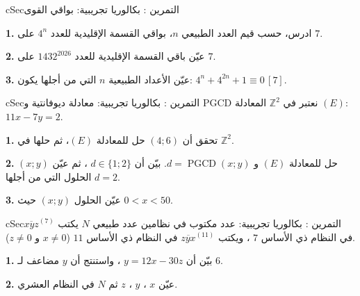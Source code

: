 \documentclass[12pt,a4paper]{article}
\newenvironment{BOX}[2]{\begin{otherlanguage}{english}\begin{arbox}{#1}{#2}}{\end{arbox}\end{otherlanguage}}
\newcounter{exo}
\newenvironment{tamrin}[1]{\stepcounter{exo}\begin{BOX}{cSec}{التمرين \theexo: #1}}{\end{BOX}}
\newcommand{\Z}{\mathbb{Z}}
\newcommand{\pgcd}{\operatorname{PGCD}}
\newcommand{\QQ}[1]{\par\smallskip\textbf{#1.} }
\begin{document}
\begin{tamrin}{بكالوريا تجريبية: بواقي القوى}
\QQ{1} ادرس، حسب قيم العدد الطبيعي $n$، بواقي القسمة الإقليدية للعدد $4^n$ على $7$.
\QQ{2} عيّن باقي القسمة الإقليدية للعدد $1432^{2026}$ على $7$.
\QQ{3} عيّن الأعداد الطبيعية $n$ التي من أجلها يكون: $4^n+4^{2n}+1\equiv0\,[7]$.
\end{tamrin}

\begin{tamrin}{بكالوريا تجريبية: معادلة ديوفانتية و PGCD}
نعتبر في $\Z^2$ المعادلة $(E)$: $11x-7y=2$.
\QQ{1} تحقق أن $(4;6)$ حل للمعادلة $(E)$، ثم حلها في $\Z^2$.
\QQ{2} $(x;y)$ حل للمعادلة $(E)$ و $d=\pgcd(x;y)$. بيّن أن $d\in\{1;2\}$ ، ثم عيّن الحلول التي من أجلها $d=2$.
\QQ{3} عيّن الحلول $(x;y)$ حيث $0<x<50$.
\end{tamrin}

\begin{tamrin}{بكالوريا تجريبية: عدد مكتوب في نظامين}
عدد طبيعي $N$ يكتب $\overline{xyz}^{(7)}$ في النظام ذي الأساس $7$ ، ويكتب $\overline{zyx}^{(11)}$ في النظام ذي الأساس $11$ ($x\neq0$ و $z\neq0$).
\QQ{1} بيّن أن $y=12x-30z$ ، واستنتج أن $y$ مضاعف لـ $6$.
\QQ{2} عيّن $x$ ، $y$ ، $z$ ثم $N$ في النظام العشري.
\end{tamrin}
\end{document}
